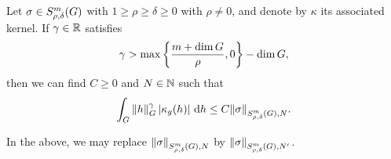 \begin{lemma}
\label{lemma:integrability_of_kernel}
    Let $\sigma \in \SymbolClass m {\rho, \delta}$ with $1 \geq \rho \geq \delta \geq 0$ with $\rho \neq 0$,
    and denote by $\kappa$ its associated kernel.
    If $\gamma \in \R$ satisfies
    \begin{align*}
        \gamma > \max \left\{\frac {m + \dim \Group} \rho, 0\right\} - \dim \Group,
    \end{align*}
    then we can find $C \geq 0$ and $N \in \N$ such that
    \begin{align*}
        \int_\Group \norm [\Group] h^\gamma \abs {\kappa_g(h)} \dd h
        \leq C \SymbolSemiNorm m {\rho, \delta} N \sigma.
    \end{align*}

    In the above,
    we may replace $\SymbolSemiNorm m {\rho, \delta} N \sigma$ by $\SymbolSemiNorm m {\rho, \delta} {N'} \sigma$.
\end{lemma}
